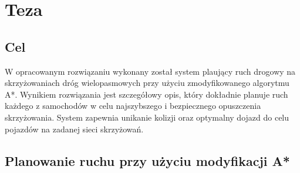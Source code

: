\chapter{Teza} \label{chap:thesis}

\section{Cel}

W opracowanym rozwiązaniu wykonany został system plaujący ruch drogowy na skrzyżowaniach dróg wielopasmowych przy użyciu zmodyfikowanego algorytmu A*. Wynikiem rozwiązania jest szczegółowy opis, który dokładnie planuje ruch każdego z samochodów w celu najszybszego i bezpiecznego opuszczenia skrzyżowania. System zapewnia unikanie kolizji oraz optymalny dojazd do celu pojazdów na zadanej sieci skrzyżowań.

\section{Planowanie ruchu przy użyciu modyfikacji A*}

